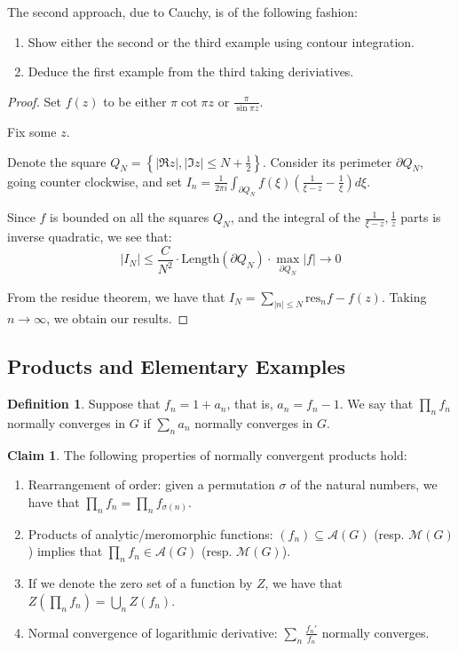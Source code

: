 \documentclass[11pt]{article} %
\theoremstyle{definition}
\newtheorem{definition}[theorem]{Definition}
\newtheorem{claim}[theorem]{Claim}
\newcommand{\abs}[1]{\left|#1\right|}
\newcommand{\res}{\text{res}}
\begin{document}
The second approach, due to Cauchy, is of the following fashion:

\begin{enumerate}
\item Show either the second or the third example using contour integration.
\item Deduce the first example from the third taking deriviatives.
\end{enumerate}

\begin{proof}

Set $f\left(z\right)$ to be either $\pi \cot \pi z$ or $\frac{\pi}{\sin \pi z}$.

Fix some $z$.

Denote the square $Q_N = \left\{\abs{\Re z}, \abs{\Im z} \leq N + \frac{1}{2} \right\}$. Consider its perimeter $\partial Q_N$, going counter clockwise, and set $I_n = \frac{1}{2\pi i}\int_{\partial Q_N} f\left(\xi\right)\left(\frac{1}{\xi - z} - \frac{1}{\xi}\right)d \xi$.

Since $f$ is bounded on all the squares $Q_N$, and the integral of the $\frac{1}{\xi -z}, \frac{1}{z}$ parts is inverse quadratic, we see that:
\[ \abs{I_N} \leq \frac{C}{N^2} \cdot\text{Length} \left(\partial Q_N \right) \cdot \max_{\partial Q_N} \abs{f} \to 0\]

From the residue theorem, we have that $I_N = \sum_{\abs{n} \leq N} \res_n f - f\left(z\right)$. Taking $n \to \infty$, we obtain our results.
\end{proof}

\subsection{Products and Elementary Examples}

\begin{definition}
Suppose that $f_n = 1 + a_n$, that is, $a_n = f_n - 1$. We say that $\prod_n f_n$ normally converges in $G$ if $\sum _n a_n$ normally converges in $G$.    
\end{definition}

\begin{claim}
The following properties of normally convergent products hold:

\begin{enumerate}
\item Rearrangement of order: given a permutation $\sigma$ of the natural numbers, we have that $\prod_n f_n = \prod_n f_{\sigma\left(n\right)}$.
\item Products of analytic/meromorphic functions: $\left(f_n\right) \subseteq \mathcal{A}\left(G\right)$ (resp. $\mathcal{M}\left(G\right)$) implies that $\prod_n f_n \in \mathcal{A}\left(G\right)$ (resp. $\mathcal{M}\left(G\right)$).
\item If we denote the zero set of a function by $Z$, we have that $Z\left(\prod_n f_n\right) = \bigcup_n Z\left(f_n\right)$.
\item Normal convergence of logarithmic derivative: $\sum_n \frac{f_n'}{f_n}$ normally converges.
\end{enumerate}
\end{claim}
\end{document}
